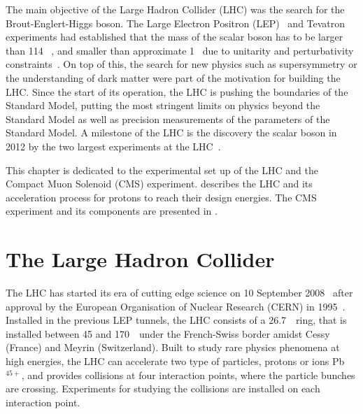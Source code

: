 
The main objective of the Large Hadron Collider (LHC) was the search for the Brout-Englert-Higgs boson. The Large  Electron Positron (LEP)~\cite{Myers:226776} and Tevatron~\cite{1748-0221-6-08-T08001} experiments had established that the mass of the scalar boson has to be larger than 114 \GeV~\cite{Barate:2003sz,Herner:2016woc}, and smaller than approximate 1 \TeV\ due to unitarity and perturbativity constraints~\cite{Djouadi:2005gi}. On top of this, the search for new physics such as supersymmetry or the understanding of dark matter were part of the motivation for building the LHC. 
Since the start of its operation, the LHC is pushing the boundaries of the Standard Model, putting the most stringent limits on physics beyond the Standard Model as well as precision measurements of the parameters of the Standard Model. A milestone of the LHC is the discovery the scalar boson in 2012 by the two largest experiments at the LHC~\cite{Chatrchyan:2012xdj,Aad:2012tfa}.

This chapter is dedicated to the experimental set up of the LHC and the Compact  Muon Solenoid (CMS) experiment.  describes the LHC and its acceleration process for protons to reach their design energies. The CMS experiment and its components are presented in . 


\section{The Large Hadron Collider}
\label{sec:LHC}
The LHC has started its era of cutting edge science on 10 September 2008~\cite{LHC:2008} after approval by the European Organisation of Nuclear Research (CERN) in 1995~\cite{Pettersson:291782}. Installed in the previous LEP tunnels, the LHC consists of a 26.7~\km\ ring, that is installed between 45 and 170~\m\ under the French-Swiss border amidst Cessy (France) and Meyrin (Switzerland). Built to study rare physics phenomena at high energies, the LHC  can accelerate two type of particles, protons or ions Pb$^{45+}$, and provides collisions at four interaction points, where the particle bunches are crossing. Experiments for studying the collisions are installed on each interaction point. 

